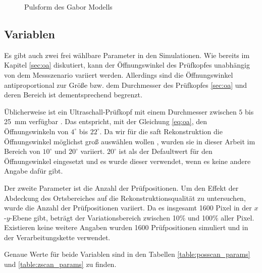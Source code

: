 \begin{figure}[h!]
\begin{center}
\caption{Pulsform des Gabor Modells}
\label{fig:gabor_pulse}
\end{center}
\end{figure}

\subsection*{Variablen}%
Es gibt auch zwei frei wählbare Parameter in den Simulationen. Wie bereits im Kapitel \ref{sec:oa} diskutiert, kann der Öffnungswinkel des Prüfkopfes unabhängig von dem Messszenario variiert werden. Allerdings sind die Öffnungswinkel antiproportional zur Größe bzw. dem Durchmesser des Prüfkopfes \ref{sec:oa} und deren Bereich ist dementsprechend begrenzt.\par Üblicherweise ist ein Ultraschall-Prüfkopf mit einem Durchmesser zwischen $5$ bis \SI{25}{\milli \metre} verfügbar \cite{TransducerCatalogue}. Das entspricht, mit der Gleichung \ref{eq:oa}, den Öffnungswinkeln von $4^{\circ}$ bis $22^{\circ}$. Da wir für die \acrshort{saft} Rekonstruktion die Öffnungswinkel möglichst groß auswählen wollen \cite{Lingvall04PhD}, wurden sie in dieser Arbeit im Bereich von $10^{\circ}$ und $20^{\circ}$ variiert.  $20^{\circ}$ ist als der Defaultwert für den Öffnungswinkel eingesetzt und es wurde dieser verwendet, wenn es keine andere Angabe dafür gibt. \par 
Der zweite Parameter ist die Anzahl der Prüfpositionen. Um den Effekt der Abdeckung des Ortsbereiches auf die Rekonstruktionsqualität zu untersuchen, wurde die Anzahl der Prüfpositionen variiert. Da es insgesamt 1600 Pixel in der $x$-$y$-Ebene gibt, beträgt der Variationsbereich zwischen 10\% und 100\% aller Pixel. Existieren keine weitere Angaben wurden 1600 Prüfpositionen simuliert und in der Verarbeitungskette verwendet. \par
Genaue Werte für beide Variablen sind in den Tabellen \ref{table:posscan_params} und \ref{table:zscan_params} zu finden. \par



